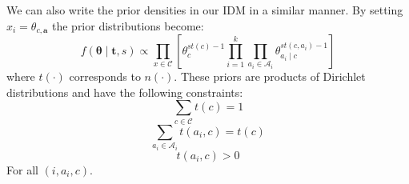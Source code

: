 We can also write the prior densities in our IDM in a similar manner. By setting $x_i = \theta_{c,\mathbf{a}}$ the prior distributions become:
\begin{equation} \label{prior}
	f(\mathbf{\theta} \mid \mathbf{t}, s) \propto \prod_{x \in \mathcal{C}} \left[ \theta_c^{st(c) - 1} \prod_{i=1}^k \prod_{a_i \in \mathcal{A}_i} \theta_{a_i \mid c}^{st(c, a_i) - 1} \right]
\end{equation}
where $t(\cdot)$ corresponds to $n(\cdot)$. These priors are products of Dirichlet distributions \cite{Zaffalon01} and have the following constraints:
\begin{equation}
	\sum_{c \in \mathcal{C}} t(c) = 1
\end{equation}
\begin{equation}
	\sum_{a_i \in \mathcal{A}_i} t(a_i, c) = t(c)
\end{equation}
\begin{equation}
	t(a_i, c) > 0
\end{equation}
For all $(i, a_i, c)$.

